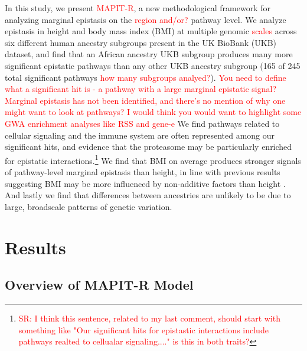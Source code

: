 \documentclass[12pt,a4paper]{article}
\newcommand{\red}[1]{\textcolor{red}{#1}}
\begin{document}
In this study, we present \red{MAPIT-R}, a new methodological framework for analyzing marginal epistasis on the \red{region and/or?} pathway level. We analyze epistasis in height and body mass index (BMI) at multiple genomic \red{scales} across six different human ancestry subgroups present in the UK BioBank (UKB) \citep{Sudlow2015} dataset, and find that an African ancestry UKB subgroup produces many more significant epistatic pathways than any other UKB ancestry subgroup (165 of 245 total significant pathways \red{how many subgroups analyed?}). \red{You need to define what a significant hit is - a pathway with a large marginal epistatic signal? Marginal epistasis has not been identified, and there's no mention of why one might want to look at pathways? I would think you would want to highlight some GWA enrichment analyses like RSS and gene-e} We find pathways related to cellular signaling and the immune system are often represented among our significant hits, and evidence that the proteasome may be particularly enriched for epistatic interactions.\footnote{\red{SR: I think this sentence, related to my last comment, should start with something like "Our significant hits for epistastic interactions include pathways realted to cellualar signaling...." is this in both traits?}} We find that BMI on average produces stronger signals of pathway-level marginal epistasis than height, in line with previous results suggesting BMI may be more influenced by non-additive factors than height \citep{Elks2012,Visscher2012}. And lastly we find that differences between ancestries are unlikely to be due to large, broadscale patterns of genetic variation.  

\section{Results}\label{InterPath-Results}

\subsection{Overview of MAPIT-R Model}\label{InterPath-Results-MAPITRModel}
\end{document}
